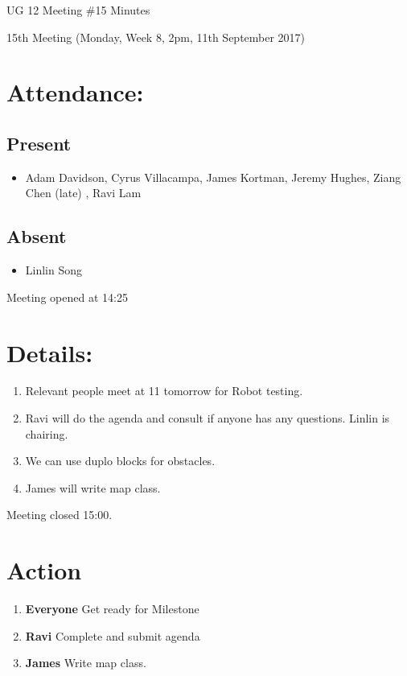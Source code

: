 \documentclass{article}
\begin{document}
\begin{adjustwidth}{2.5em}{0pt}
\begin{center}
\Large{UG 12 Meeting \#15 Minutes}\\
\end{center}
\end{adjustwidth}


15th Meeting (Monday, Week 8, 2pm, 11th September 2017)
\section{Attendance:}
\subsection*{Present}
\begin{itemize}
\item Adam Davidson, Cyrus Villacampa, James Kortman, Jeremy Hughes, Ziang Chen (late) , Ravi Lam
\end{itemize}
\subsection*{Absent}
\begin{itemize}
\item  Linlin Song
\end {itemize}

Meeting opened at 14:25
\section{Details:}
\begin{enumerate}
\item Relevant people meet at 11 tomorrow for Robot testing.
\item Ravi will do the agenda and consult if anyone has any questions. Linlin is chairing.
\item We can use duplo blocks for obstacles.
\item James will write map class.

\end{enumerate}

Meeting closed 15:00.

\section{Action}
\begin{enumerate}
\item \textbf{Everyone} Get ready for Milestone
\item \textbf{Ravi} Complete and submit agenda
\item \textbf{James} Write map class.
\end{enumerate}
\end{document}
